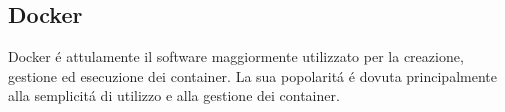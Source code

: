 \subsection{Docker}
\cite{docker}Docker é attulamente il software maggiormente utilizzato per la creazione, gestione ed esecuzione dei container. La sua popolaritá é dovuta principalmente alla semplicitá di utilizzo e alla gestione dei container.

